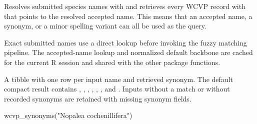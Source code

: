 \documentclass[a4paper]{book}
\begin{document}
%
\begin{Details}
Resolves submitted species names with  and retrieves every
WCVP record with  that points to the resolved
accepted name. This means that an accepted name, a synonym, or a minor
spelling variant can all be used as the query.

Exact submitted names use a direct lookup before invoking the fuzzy matching
pipeline. The accepted-name lookup and normalized default backbone are
cached for the current R session and shared with the other package functions.
\end{Details}
%
\begin{Value}
A tibble with one row per input name and retrieved synonym. The
default compact result contains , ,
, , ,
, and . Inputs without a match or
without recorded synonyms are retained with missing synonym fields.
\end{Value}
%
\begin{Examples}
\begin{ExampleCode}


wcvp_synonyms("Nopalea cochenillifera")


\end{ExampleCode}
\end{Examples}
\printindex{}
\end{document}
